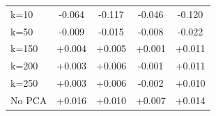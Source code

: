 \begin{tabular}{lcccc}
\hspace*{1em}k=10 & -0.064 & -0.117 & -0.046 & -0.120 \\
\hspace*{1em}k=50 & -0.009 & -0.015 & -0.008 & -0.022 \\
\hspace*{1em}k=150 & +0.004 & +0.005 & +0.001 & +0.011 \\
\hspace*{1em}k=200 & +0.003 & +0.006 & -0.001 & +0.011 \\
\hspace*{1em}k=250 & +0.003 & +0.006 & -0.002 & +0.010 \\
\hspace*{1em}No PCA & +0.016 & +0.010 & +0.007 & +0.014 \\
\bottomrule
\end{tabular}
